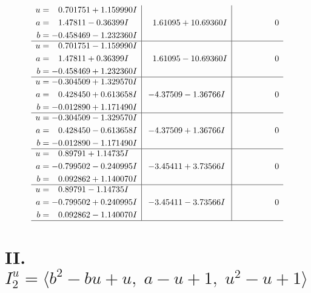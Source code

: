 \documentclass[1p]{elsarticle_modified}
\theoremstyle{definition}
\begin{document}
$$\begin{array}{c|c|c}
\begin{aligned}
u &= \phantom{-}0.701751 + 1.159990 I \\
a &= \phantom{-}1.47811 - 0.36399 I \\
b &= -0.458469 - 1.232360 I\end{aligned}
 & \phantom{-}1.61095 + 10.69360 I & \phantom{-0.000000 } 0 \\ \hline\begin{aligned}
u &= \phantom{-}0.701751 - 1.159990 I \\
a &= \phantom{-}1.47811 + 0.36399 I \\
b &= -0.458469 + 1.232360 I\end{aligned}
 & \phantom{-}1.61095 - 10.69360 I & \phantom{-0.000000 } 0 \\ \hline\begin{aligned}
u &= -0.304509 + 1.329570 I \\
a &= \phantom{-}0.428450 + 0.613658 I \\
b &= -0.012890 + 1.171490 I\end{aligned}
 & -4.37509 - 1.36766 I & \phantom{-0.000000 } 0 \\ \hline\begin{aligned}
u &= -0.304509 - 1.329570 I \\
a &= \phantom{-}0.428450 - 0.613658 I \\
b &= -0.012890 - 1.171490 I\end{aligned}
 & -4.37509 + 1.36766 I & \phantom{-0.000000 } 0 \\ \hline\begin{aligned}
u &= \phantom{-}0.89791 + 1.14735 I \\
a &= -0.799502 - 0.240995 I \\
b &= \phantom{-}0.092862 + 1.140070 I\end{aligned}
 & -3.45411 + 3.73566 I & \phantom{-0.000000 } 0 \\ \hline\begin{aligned}
u &= \phantom{-}0.89791 - 1.14735 I \\
a &= -0.799502 + 0.240995 I \\
b &= \phantom{-}0.092862 - 1.140070 I\end{aligned}
 & -3.45411 - 3.73566 I & \phantom{-0.000000 } 0\\
 \hline 
 \end{array}$$\newpage\newpage\renewcommand{\arraystretch}{1}
\centering \section*{II. $I^u_{2}= \langle b^2- b u+u,\;a- u+1,\;u^2- u+1 \rangle$}
\end{document}
